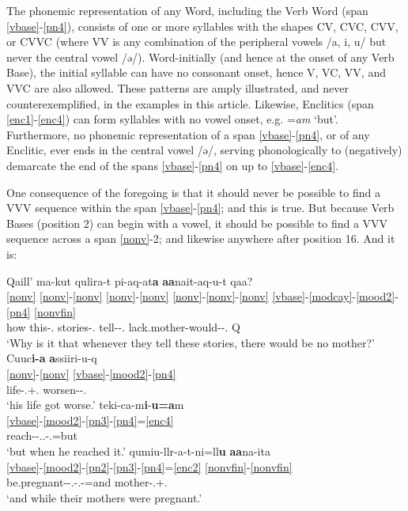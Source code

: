 \documentclass[output=paper]{langscibook}
\begin{document}
 \label{sec:5.7.3}

The phonemic representation of any Word, including the Verb Word (span \ref{vbase}-\ref{pn4}), consists of one or more syllables with the shapes CV, CVC, CVV, or CVVC (where VV is any combination of the peripheral vowels /a, i, u/ but never the central vowel /ǝ/). Word-initially (and hence at the onset of any Verb Base), the initial syllable can have no consonant onset, hence V, VC, VV, and VVC are also allowed. These patterns are amply illustrated, and never counterexemplified, in the examples in this article. Likewise, Enclitics (span \ref{enc1}-\ref{enc4}) can form syllables with no vowel onset, e.g. =\textit{am} `but'. Furthermore, no phonemic representation of a span \ref{vbase}-\ref{pn4}, or of any Enclitic, ever ends in the central vowel /ǝ/, serving phonologically to (negatively) demarcate the end of the spans \ref{vbase}-\ref{pn4} on up to \ref{vbase}-\ref{enc4}.

One consequence of the foregoing is that it should never be possible to find a VVV sequence within the span \ref{vbase}-\ref{pn4}; and this is true. But because Verb Bases (position 2) can begin with a vowel, it should be possible to find a VVV sequence across a span \ref{nonv}-2; and likewise anywhere after position 16. And it is:

\ea\label{ex:key:42}
\ea\label{ex:key:42a}
\glll Qaill' ma-kut qulira-t pi-aq-at\textbf{a} \textbf{aa}nait-aq-u-t qaa?\\
    \ref{nonv} \ref{nonv}-\ref{nonv} \ref{nonv}-\ref{nonv} \ref{nonv}-\ref{nonv}-\ref{nonv} \ref{vbase}-\ref{modcay}-\ref{mood2}-\ref{pn4} \ref{nonvfin} \\
     how this-\Abs.\Pl{} stories-\Abs.\Pl{} tell-\Contin-\Tpl.\Sarg{} lack.mother-would-\Ind{}-\Tpl.\Sarg{} Q\\
\glt `Why is it that whenever they tell these stories, there would be no mother?'
\ex\label{ex:key:42b}
\glll Cuuc\textbf{i-a} \textbf{a}ssiiri-u-q\\
    \ref{nonv}-\ref{nonv} \ref{vbase}-\ref{mood2}-\ref{pn4} \\
     life-\Abs.\Sg{}+\Tsg.\Poss{} worsen-\Ind{}-\Tsg.\Sarg{}\\
\glt `his life got worse.'
\ex\label{ex:key:42c}
\glll teki-ca-m\textbf{i}{}-\textbf{u=a}m\\
    \ref{vbase}-\ref{mood2}-\ref{pn3}-\ref{pn4}=\ref{enc4} \\
     reach-\Conseq-\Third \Refl.\Sg.\Aarg{}-\Tsg.\Obj{}=but\\
\glt `but when he reached it.'
\ex\label{ex:key:42d}
\glll qumiu-llr-a-t-ni=ll\textbf{u} \textbf{aa}na-ita\\
    \ref{vbase}-\ref{mood2}-\ref{pn2}-\ref{pn3}-\ref{pn4}=\ref{enc2} \ref{nonvfin}-\ref{nonvfin}\\
     be.pregnant-\Contmp-\Tsg.\Obj{}-\Tpl.\Aarg{}-\Contmp=and mother-\Rel.\Pl+\Tpl.\Poss{}\\
\glt `and while their mothers were pregnant.'
\z
\z
\end{document}
